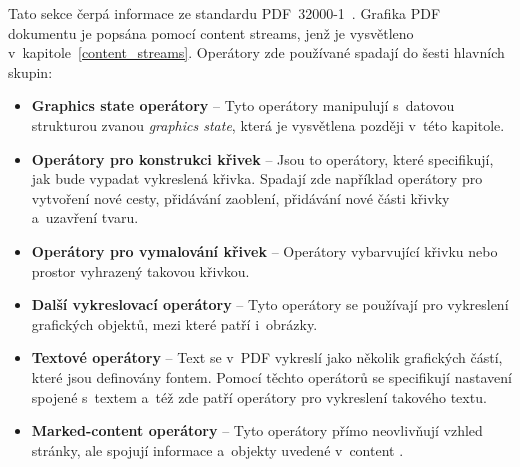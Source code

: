 Tato sekce čerpá informace ze standardu PDF~32000-1~\cite{PDF32000-1:2008}.
Grafika PDF dokumentu je popsána pomocí content streams, jenž je vysvětleno
v~kapitole~\ref{content_streams}. Operátory zde používané spadají do šesti
hlavních skupin:
\begin{itemize}
    \item \textbf{Graphics state operátory} -- Tyto operátory manipulují
    s~datovou strukturou zvanou \emph{graphics state}, která je vysvětlena později
    v~této kapitole.
    \item \textbf{Operátory pro konstrukci křivek} -- Jsou to operátory, které
    specifikují, jak bude vypadat vykreslená křivka. Spadají zde například
    operátory pro vytvoření nové cesty, přidávání zaoblení, přidávání nové části
    křivky a~uzavření tvaru.
    \item \textbf{Operátory pro vymalování křivek} -- Operátory vybarvující
    křivku nebo prostor vyhrazený takovou křivkou.
    \item \textbf{Další vykreslovací operátory} -- Tyto operátory se používají
    pro vykreslení grafických objektů, mezi které patří i~obrázky.
    \item \textbf{Textové operátory} -- Text se v~PDF vykreslí jako několik
    grafických částí, které jsou definovány fontem. Pomocí těchto operátorů
    se specifikují nastavení spojené s~textem a~též zde patří operátory pro
    vykreslení takového textu. 
    \item \textbf{Marked-content operátory} -- Tyto operátory přímo neovlivňují
    vzhled stránky, ale spojují informace a~objekty uvedené v~content
    .
\end{itemize}




